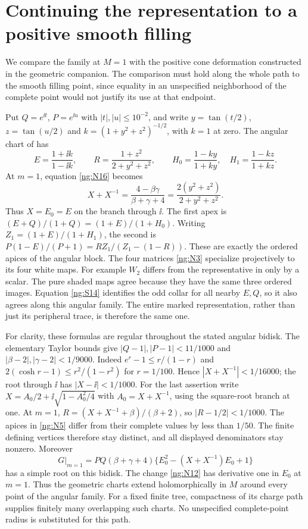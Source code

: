 \section{Continuing the representation to a positive smooth filling}
\label{ng:anchor}

We compare the family at $M=1$ with the positive cone deformation
constructed in the geometric companion. The comparison must hold
along the whole path to the smooth filling point, since equality
in an unspecified neighborhood of the complete point would not
justify its use at that endpoint.

Put $Q=e^{\ii t}$, $P=e^{\ii u}$ with $|t|,|u|\le10^{-2}$,
and write $y=\tan(t/2)$, $z=\tan(u/2)$ and
$k=(1+y^2+z^2)^{-1/2}$, with $k=1$ at zero.
The angular chart of \cite[Section~3, equations~(3.3)--(3.5)]{Circle}
has
\begin{equation}\label{ng:angular-match}
 E=\frac{1+\ii k}{1-\ii k},\qquad
 R=\frac{1+z^2}{2+y^2+z^2},\qquad
 H_0=\frac{1-ky}{1+ky},\quad H_1=\frac{1-kz}{1+kz}.
\end{equation}
At $m=1$, equation \eqref{ng:N16} becomes
\[
 X+X^{-1}=\frac{4-\beta\gamma}{\beta+\gamma+4}
       =\frac{2(y^2+z^2)}{2+y^2+z^2}.
\]
Thus $X=E_0=E$ on the branch through $\ii$.
The first apex is
$(E+Q)/(1+Q)=(1+E)/(1+H_0)$.
Writing $Z_1=(1+E)/(1+H_1)$, the second is
$P(1-E)/(P+1)=RZ_1/(Z_1-(1-R))$.
These are exactly the ordered apices of the angular block.
The four matrices \eqref{ng:N3} specialize projectively to its
four white maps. For example $W_2$ differs from the representative
in \cite[equation~(3.8)]{Circle} only by a scalar.
The pure shaded maps agree because they have the same three ordered
images. Equation \eqref{ng:S14} identifies the odd collar for all
nearby $E,Q$, so it also agrees along this angular family.
The entire marked representation, rather than just its peripheral
trace, is therefore the same one.

For clarity, these formulas are regular throughout the stated angular
bidisk. The elementary Taylor bounds give
$|Q-1|,|P-1|<11/1000$ and
$|\beta-2|,|\gamma-2|<1/9000$.
Indeed $e^r-1\le r/(1-r)$ and
$2(\cosh r-1)\le r^2/(1-r^2)$ for $r=1/100$.
Hence $|X+X^{-1}|<1/16000$; the root through $\ii$ has
$|X-\ii|<1/1000$.
For the last assertion write
$X=A_0/2+\ii\sqrt{1-A_0^2/4}$ with $A_0=X+X^{-1}$,
using the square-root branch at one.
At $m=1$,
$R=(X+X^{-1}+\beta)/(\beta+2)$, so $|R-1/2|<1/1000$.
The apices in \eqref{ng:N5} differ from their complete values by
less than $1/50$. The finite defining vertices therefore stay
distinct, and all displayed denominators stay nonzero.
Moreover
\[
 G|_{m=1}=PQ(\beta+\gamma+4)
              \{E_0^2-(X+X^{-1})E_0+1\}
\]
has a simple root on this bidisk. The change \eqref{ng:N12}
has derivative one in $E_0$ at $m=1$.
Thus the geometric charts extend holomorphically in $M$ around every
point of the angular family. For a fixed finite tree, compactness of
its charge path supplies finitely many overlapping such charts.
No unspecified complete-point radius is substituted for this path.

